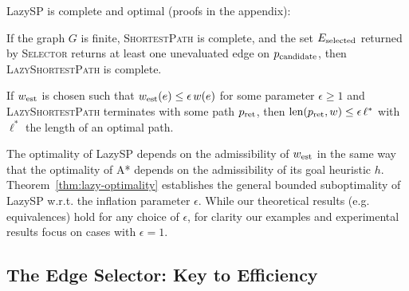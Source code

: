 
LazySP is complete and optimal
(proofs in the appendix):

\begin{theorem}
If the graph $G$ is finite,
\textsc{ShortestPath} is complete,
and the set $E_{\mbox{\scriptsize selected}}$
returned by \textsc{Selector}
returns at least one unevaluated edge on $p_{\mbox{\scriptsize candidate}}$,
then \textsc{LazyShortestPath} is complete.
\label{thm:lazy-completeness}
\end{theorem}

\begin{theorem}
If $w_{\mbox{\scriptsize est}}$ is chosen such that
$w_{\mbox{\scriptsize est}}(e) \leq \epsilon \, w(e)$ for some parameter
$\epsilon \geq 1$ and
\textsc{LazyShortestPath} terminates
with some path $p_{\mbox{\scriptsize ret}}$,
then $\mbox{len}(p_{\mbox{\scriptsize ret}}, w) \leq \epsilon \, \ell^*$
with $\ell^*$ the length of an optimal path.
\label{thm:lazy-optimality}
\end{theorem}

The optimality of LazySP depends on the admissibility of
$w_{\mbox{\scriptsize est}}$
in the same way that the optimality of A* depends on
the admissibility of its goal heuristic $h$.
Theorem~\ref{thm:lazy-optimality} establishes the general
bounded suboptimality of LazySP
w.r.t. the inflation parameter $\epsilon$.
While our theoretical results (e.g. equivalences)
hold for any choice of $\epsilon$,
for clarity our examples and experimental results
focus on cases with $\epsilon = 1$.

\subsection{The Edge Selector: Key to Efficiency}

